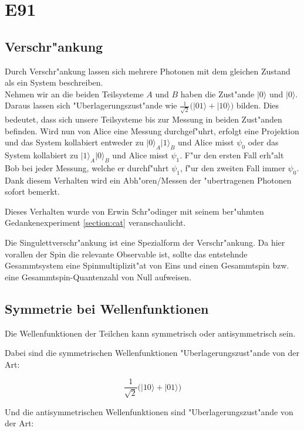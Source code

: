 \newcommand{\qcste}{$-22.5^{\circ}$}
\newcommand{\qcstz}{$0^{\circ}$}
\newcommand{\qcstd}{$22.5^{\circ}$}
\newcommand{\qcstv}{$45^{\circ}$}

\section{E91}
  \subsection{Verschr"ankung}
  Durch Verschr"ankung lassen sich mehrere Photonen mit dem gleichen Zustand als ein System beschreiben.\\
  Nehmen wir an die beiden Teilsysteme $A$ und $B$ haben die Zust"ande $|0\rangle$ und $|0\rangle$. Daraus
  lassen sich "Uberlagerungszust"ande wie $\frac{1}{\sqrt{2}}\big(|01\rangle + |10\rangle\big)$ bilden. Dies bedeutet, dass sich unsere
  Teilsysteme bis zur Messung in beiden Zust"anden befinden.
  Wird nun von Alice eine Messung durchgef"uhrt, erfolgt eine Projektion und
  das System kollabiert entweder zu $\lvert0\rangle_A|1\rangle_B$ und Alice misst $\psi_0$ oder
  das System kollabiert zu $\lvert1\rangle_A|0\rangle_B$ und Alice misst $\psi_1$.
  F"ur den ersten Fall erh"alt Bob bei jeder Messung,
  welche er durchf"uhrt $\psi_1$, f"ur den zweiten Fall immer $\psi_0$.
  Dank diesem Verhalten wird ein Abh"oren/Messen der "ubertragenen Photonen sofort bemerkt.

  Dieses Verhalten wurde von Erwin Schr"odinger mit seinem
  ber"uhmten Gedankenexperiment \ref{section:cat} veranschaulicht.

  Die Singulettverschr"ankung ist eine Spezialform der Verschr"ankung. Da hier vorallen der Spin die relevante Observable ist, sollte das entstehnde Gesammtsystem eine Spinmultiplizit"at von Eins und einen Gesammtspin bzw. eine Gesammtspin-Quantenzahl von Null aufweisen.

  \subsection{Symmetrie bei Wellenfunktionen}
  Die Wellenfunktionen der Teilchen kann symmetrisch oder antisymmetrisch sein.

  Dabei sind die symmetrischen Wellenfunktionen "Uberlagerungszust"ande von der Art:

  \[\frac{1}{\sqrt{2}}\big(|10\rangle+|01\rangle\big)\]

  Und die antisymmetrischen Wellenfunktionen sind "Uberlagerungszust"ande von der Art:

